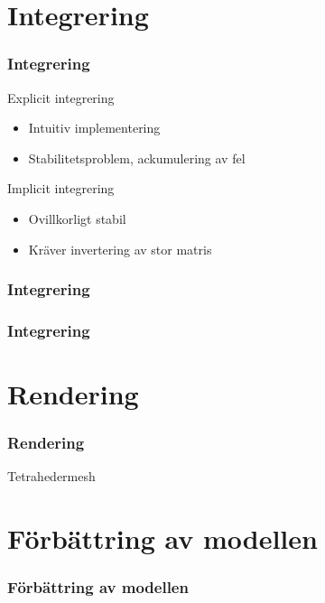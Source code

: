 \documentclass{beamer}
\begin{document}
\section{Integrering}
\begin{frame}
\frametitle{Integrering}
\begin{block}{Explicit integrering}
\begin{itemize}
\item Intuitiv implementering
\item Stabilitetsproblem, ackumulering av fel
\end{itemize}
\end{block}

\begin{block}{Implicit integrering}
\begin{itemize}
\item Ovillkorligt stabil
\item Kräver invertering av stor matris
\end{itemize}
\end{block}

\end{frame}

\begin{frame}
\frametitle{Integrering}
\end{frame}

\begin{frame}
\frametitle{Integrering}
\end{frame}

\section{Rendering}
\begin{frame}
\frametitle{Rendering}
\begin{block}{Tetrahedermesh}

\end{block}
\end{frame}

\section{Förbättring av modellen}
\begin{frame}
\frametitle{Förbättring av modellen}
\end{frame}
\end{document}
